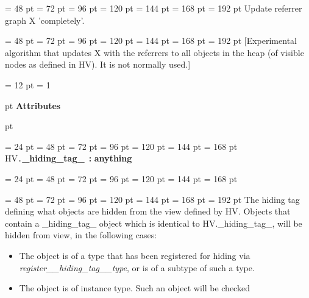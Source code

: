 {{{{{\par}
\par}
{\par \noindent  \leftskip = 48 pt  \leftmargini = 72 pt  \leftmarginii = 96 pt  \leftmarginiii = 120 pt  \leftmarginiv = 144 pt  \leftmarginv = 168 pt  \leftmarginvi = 192 pt  Update referrer graph X 'completely'.\par}
{\par \noindent  \leftskip = 48 pt  \leftmargini = 72 pt  \leftmarginii = 96 pt  \leftmarginiii = 120 pt  \leftmarginiv = 144 pt  \leftmarginv = 168 pt  \leftmarginvi = 192 pt  {[}Experimental algorithm that updates X with the referrers to all
objects in the heap (of visible nodes as defined in HV). It is not
normally used.]
\par}
\par}
\par}
{\par \pagebreak[3.300000] \noindent \hangindent = 12 pt \hangafter = 1 
{\par \pagebreak[3]  pt \noindent
{\Large {\bf Attributes\/}}\par {} pt
} \noindent
\par}
{\par \noindent  \leftskip = 24 pt  \leftmargini = 48 pt  \leftmarginii = 72 pt  \leftmarginiii = 96 pt  \leftmarginiv = 120 pt  \leftmarginv = 144 pt  \leftmarginvi = 168 pt HV{\tt .\/}{\bf {\large {\bf {\_}hiding{\_}tag{\_}\/}}\/}~{\bf :} {\bf  anything\/}\par}
{\par \noindent  \leftskip = 24 pt  \leftmargini = 48 pt  \leftmarginii = 72 pt  \leftmarginiii = 96 pt  \leftmarginiv = 120 pt  \leftmarginv = 144 pt  \leftmarginvi = 168 pt {\par \noindent
{\par \noindent  \leftskip = 48 pt  \leftmargini = 72 pt  \leftmarginii = 96 pt  \leftmarginiii = 120 pt  \leftmarginiv = 144 pt  \leftmarginv = 168 pt  \leftmarginvi = 192 pt  The hiding tag defining what objects are hidden from the view defined
by HV. Objects that contain a {\_}hiding{\_}tag{\_} object which is identical
to HV.{\_}hiding{\_}tag{\_}, will be hidden from view, in the following cases:\begin{itemize}
\item  The object is of a type that has been registered for hiding via  {\em register{\_}{\_}hiding{\_}tag{\_}{\_}type\/}, or is of a subtype of such a type.\item  The object is of instance type. Such an object will be checked

\end{itemize}}}}}
